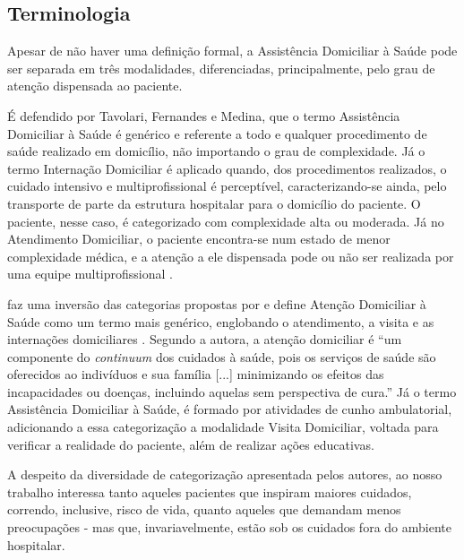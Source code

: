 \subsection{Terminologia}\label{subsec:terminologia}

Apesar de não haver uma definição formal, a Assistência Domiciliar à Saúde pode
ser separada em três modalidades, diferenciadas, principalmente, pelo grau de 
atenção dispensada ao paciente. 

É defendido por Tavolari, Fernandes e Medina, que o termo Assistência Domiciliar
à Saúde é genérico e referente a todo e qualquer procedimento de saúde realizado
em domicílio, não importando o grau de complexidade. Já o termo Internação
Domiciliar é aplicado quando, dos procedimentos realizados, o cuidado intensivo
e multiprofissional é perceptível, caracterizando-se ainda, pelo transporte de
parte da estrutura hospitalar para o domicílio do paciente. O paciente, nesse
caso, é categorizado com complexidade alta ou moderada.
Já no Atendimento Domiciliar, o paciente encontra-se num estado de menor 
complexidade médica, e a atenção a ele dispensada pode ou não ser realizada por
uma equipe multiprofissional \cite{tavolari2000desenvolvimento}.


 faz uma inversão das categorias propostas
por  e  define Atenção Domiciliar à
Saúde como um termo mais genérico, englobando o atendimento, a visita e as
internações domiciliares \cite{giacomozzi2006pratica}. Segundo a autora, a
atenção domiciliar é ``um componente do \textit{continuum} dos cuidados à
saúde, pois os serviços de saúde são oferecidos ao indivíduos e sua família
[...] minimizando os efeitos das incapacidades ou doenças, incluindo aquelas
sem perspectiva de cura.'' Já o termo Assistência Domiciliar à Saúde, é formado
por atividades de cunho ambulatorial, adicionando a essa categorização a
modalidade Visita Domiciliar, voltada para verificar a realidade do paciente,
além de realizar ações educativas.

A despeito da diversidade de categorização apresentada pelos autores, ao nosso
trabalho interessa tanto aqueles pacientes que inspiram maiores cuidados,
correndo, inclusive, risco de vida, quanto aqueles que demandam menos
preocupações - mas que, invariavelmente, estão sob os cuidados fora do
ambiente hospitalar.

